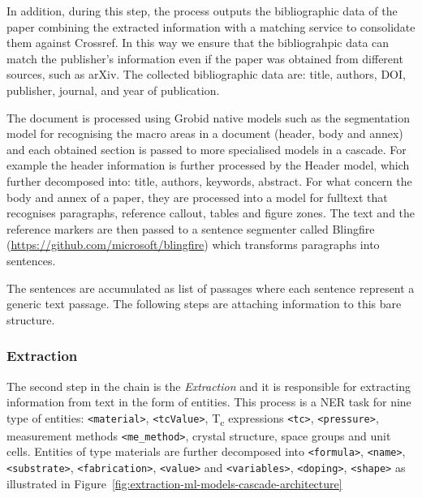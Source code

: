 \documentclass{article}
\begin{document}
In addition, during this step, the process outputs the bibliographic data of the paper combining the extracted information with a matching service to consolidate them against Crossref. In this way we ensure that the bibliograhpic data can match the publisher's information even if the paper was obtained from different sources, such as arXiv. The collected bibliographic data are: title, authors, DOI, publisher, journal, and year of publication.

The document is processed using Grobid native models such as the segmentation model for recognising the macro areas in a document (header, body and annex) and each obtained section is passed to more specialised models in a cascade. For example the header information is further processed by the Header model, which further decomposed into: title, authors, keywords, abstract. 
For what concern the body and annex of a paper, they are processed into a model for fulltext that recognises paragraphs, reference callout, tables and figure zones. 
The text and the reference markers are then passed to a sentence segmenter called Blingfire (\url{https://github.com/microsoft/blingfire}) which transforms paragraphs into sentences. 

The sentences are accumulated as list of passages where each sentence represent a generic text passage. 
The following steps are attaching information to this bare structure. 


\subsubsection{Extraction}

The second step in the chain is the \textit{Extraction} and it is responsible for extracting information from text in the form of entities. 
This process is a NER task for nine type of entities: \texttt{<material>}, \texttt{<tcValue>}, T\textsubscript{c} expressions \texttt{<tc>}, \texttt{<pressure>}, measurement methods \texttt{<me\_method>}, crystal structure, space groups and unit cells. 
Entities of type materials are further decomposed into \texttt{<formula>}, \texttt{<name>}, \texttt{<substrate>}, \texttt{<fabrication>}, \texttt{<value>} and \texttt{<variables>}, \texttt{<doping>}, \texttt{<shape>} as illustrated in Figure~\ref{fig:extraction-ml-models-cascade-architecture}
\end{document}
